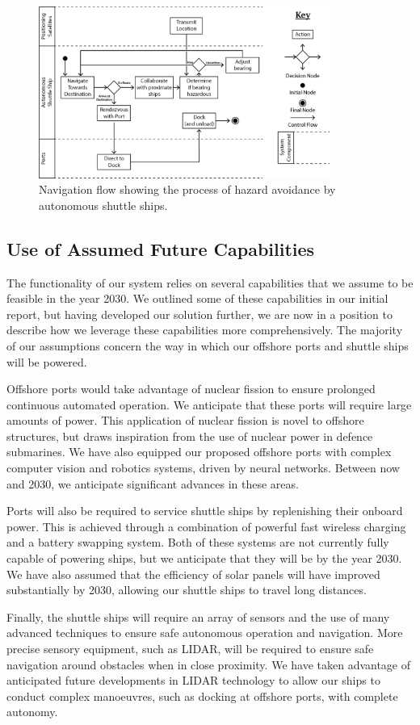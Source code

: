 \begin{figure}[h!]
\centering
	\includegraphics[width=0.85\textwidth]{images/arch_3}
	\caption{Navigation flow showing the process of hazard avoidance by autonomous shuttle ships.}
	\label{fig:arch_3}
\end{figure}

\subsection{Use of Assumed Future Capabilities}

The functionality of our system relies on several capabilities that we assume to be feasible in the year 2030. We outlined some of these capabilities in our initial report, but having developed our solution further, we are now in a position to describe how we leverage these capabilities more comprehensively. The majority of our assumptions concern the way in which our offshore ports and shuttle ships will be powered.

Offshore ports would take advantage of nuclear fission to ensure prolonged continuous automated operation. We anticipate that these ports will require large amounts of power. This application of nuclear fission is novel to offshore structures, but draws inspiration from the use of nuclear power in defence submarines. We have also equipped our proposed offshore ports with complex computer vision and robotics systems, driven by neural networks. Between now and 2030, we anticipate significant advances in these areas.

Ports will also be required to service shuttle ships by replenishing their onboard power. This is achieved through a combination of powerful fast wireless charging and a battery swapping system. Both of these systems are not currently fully capable of powering ships, but we anticipate that they will be by the year 2030. We have also assumed that the efficiency of solar panels will have improved substantially by 2030, allowing our shuttle ships to travel long distances.

Finally, the shuttle ships will require an array of sensors and the use of many advanced techniques to ensure safe autonomous operation and navigation. More precise sensory equipment, such as LIDAR, will be required to ensure safe navigation around obstacles when in close proximity. We have taken advantage of anticipated future developments in LIDAR technology to allow our ships to conduct complex manoeuvres, such as docking at offshore ports, with complete autonomy.

